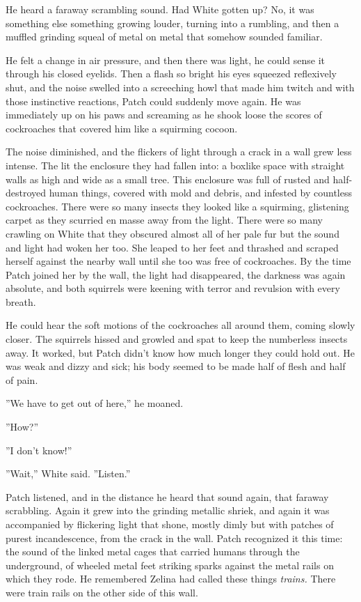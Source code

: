 \documentclass[12pt]{book}
\begin{document}
He heard a faraway scrambling sound. Had White gotten up? No, it was something else %
something growing louder, turning into a rumbling, and then a muffled grinding squeal of metal on metal that somehow sounded familiar.

He felt a change in air pressure, and then there was light, he could sense it through his closed eyelids. Then a flash so bright his eyes squeezed reflexively shut, and the noise swelled into a screeching howl that made him twitch %
and with those instinctive reactions, Patch could suddenly move again. He was immediately up on his paws and screaming as he shook loose the scores of cockroaches that covered him like a squirming cocoon.

The noise diminished, and the flickers of light through a crack in a wall grew less intense. The lit the enclosure they had fallen into: a boxlike space with straight walls as high and wide as a small tree. This enclosure was full of rusted and half-destroyed human things, covered with mold and debris, and infested by countless cockroaches. There were so many insects they looked like a squirming, glistening carpet as they scurried en masse away from the light. There were so many crawling on White that they obscured almost all of her pale fur %
but the sound and light had woken her too. She leaped to her feet and thrashed and scraped herself against the nearby wall until she too was free of cockroaches. By the time Patch joined her by the wall, the light had disappeared, the darkness was again absolute, and both squirrels were keening with terror and revulsion with every breath.

He could hear the soft motions of the cockroaches all around them, coming slowly closer. The squirrels hissed and growled and spat to keep the numberless insects away. It worked, but Patch didn't know how much longer they could hold out. He was weak and dizzy and sick; his body seemed to be made half of flesh and half of pain.

''We have to get out of here,'' he moaned.

''How?''

''I don't know!''

''Wait,'' White said. ''Listen.''

Patch listened, and in the distance he heard that sound again, that faraway scrabbling. Again it grew into the grinding metallic shriek, and again it was accompanied by flickering light that shone, mostly dimly but with patches of purest incandescence, from the crack in the wall. Patch recognized it this time: the sound of the linked metal cages that carried humans through the underground, of wheeled metal feet striking sparks against the metal rails on which they rode. He remembered Zelina had called these things {\it trains.} There were train rails on the other side of this wall.
\end{document}
